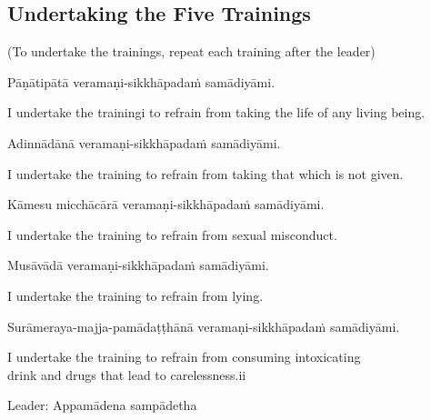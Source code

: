 \subsection*{Undertaking the Five Trainings}

\begin{center}
(To undertake the trainings, repeat each training after the leader)\\
\end{center}

Pāṇātipātā veramaṇi-sikkhāpadaṁ samādiyāmi.\\

\begin{english}
I undertake the trainingi to refrain from taking the life of any living being.\\
\end{english}

Adinnādānā veramaṇi-sikkhāpadaṁ samādiyāmi.\\

\begin{english}
I undertake the training to refrain from taking that which is not given.\\
\end{english}

Kāmesu micchācārā veramaṇi-sikkhāpadaṁ samādiyāmi.\\

\begin{english}
I undertake the training to refrain from sexual misconduct.\\
\end{english}

Musāvādā veramaṇi-sikkhāpadaṁ samādiyāmi.\\

\begin{english}
I undertake the training to refrain from lying.\\
\end{english}

Surāmeraya-majja-pamādaṭṭhānā veramaṇi-sikkhāpadaṁ samādiyāmi.\\

\begin{english}
I undertake the training to refrain from consuming intoxicating\\
drink and drugs that lead to carelessness.ii\\
\end{english}

Leader: Appamādena sampādetha\\


